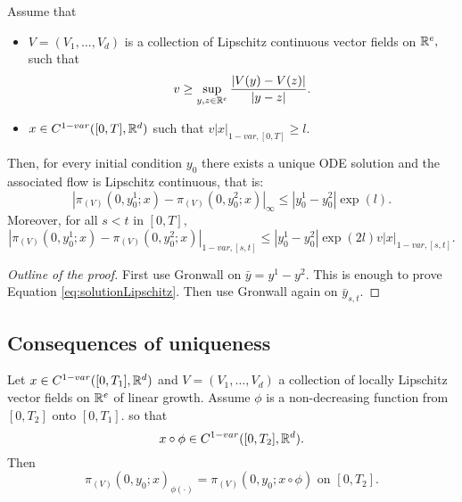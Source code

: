 \begin{theorem}
    Assume that 
    \begin{itemize}
        \item $V = (V_1, \ldots, V_d)$ is a collection of Lipschitz continuous vector fields on $\mathbb{R}^e,$ such that
        \begin{equation}
            v \geq \sup_{y,z \in \mathbb{R}^e} \frac{|V(y) - V(z)|}{|y - z|}.
        \end{equation}
        \item $x \in C^{1-var}([0,T],\mathbb{R}^d)$ such that $v |x|_{1-var,[0,T]} \geq l.$
    \end{itemize}
    Then, for every initial condition $y_0$ there exists a unique ODE solution and the associated flow is Lipschitz continuous, that is:
    \begin{equation}\label{eq:solutionLipschitz}
         |\pi_{(V)}(0, y^1_0; x) - \pi_{(V)}(0, y^2_0; x)|_\infty \leq |y^1_0 - y^2_0| \exp(l).
    \end{equation}
    Moreover, for all $s < t$ in $[0,T],$
    \begin{equation}
        |\pi_{(V)}(0, y^1_0; x) - \pi_{(V)}(0, y^2_0; x)|_{1-var,[s,t]} \leq |y^1_0 - y^2_0| \exp(2l) v |x|_{1-var,[s,t]}.
    \end{equation}
\end{theorem}
\begin{proof}[Outline of the proof]
    First use Gronwall on $\bar{y} = y^1 - y^2.$ This is enough to prove Equation \eqref{eq:solutionLipschitz}.
    Then use Gronwall again on $\bar{y}_{s,t}.$
\end{proof}

\subsection{Consequences of uniqueness}
\begin{proposition}
    Let $x \in C^{1-var}([0,T_1], \mathbb{R}^d)$ and $V = (V_1, \ldots, V_d)$ a collection of locally Lipschitz vector fields on $\mathbb{R}^e$ of linear growth.
    Assume $\phi$ is a non-decreasing function from $[0,T_2]$ onto $[0,T_1].$ so that
\begin{equation}
    x \circ \phi \in C^{1-var}([0,T_2], \mathbb{R}^d).
\end{equation}
Then 
\begin{equation}
    \pi_{(V)}(0, y_0; x)_{\phi(\cdot)} = \pi_{(V)}(0, y_0; x \circ \phi) \text{ on } [0,T_2].
\end{equation}
\end{proposition}

